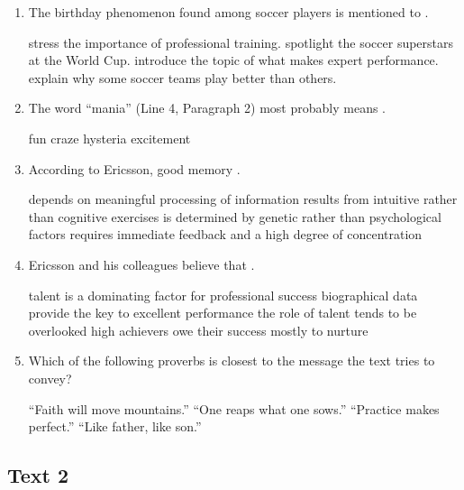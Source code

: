\begin{enumerate}[resume]
	\item
 The birthday phenomenon found among soccer players is
mentioned to \lineread.


\fourchoices
{stress the importance of professional training.}
{spotlight the soccer superstars at the World Cup.}
{introduce the topic of what makes expert performance.}
{explain why some soccer teams play better than others.}


\item
The word ``mania'' (Line 4, Paragraph 2) most probably
means \lineread.



\fourchoices
{fun}
{craze}
{hysteria}
{excitement}




\item
According to Ericsson, good memory \lineread.


\fourchoices
{depends on meaningful processing of information}
{results from intuitive rather than cognitive exercises}
{is determined by genetic rather than psychological factors}
{requires immediate feedback and a high degree of concentration}



\item
Ericsson and his colleagues believe that \lineread.


\fourchoices
{talent is a dominating factor for professional success}
{biographical data provide the key to excellent performance}
{the role of talent tends to be overlooked}
{high achievers owe their success mostly to nurture}



\item
Which of the following proverbs is closest to the message
the text tries to convey?


\fourchoices
{``Faith will move mountains.''}
{``One reaps what one sows.''}
{``Practice makes perfect.''}
{``Like father, like son.''}


\end{enumerate}



\newpage
\subsection{Text 2}


